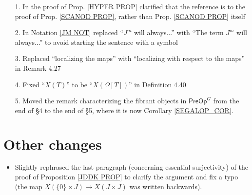 \documentclass{article}
\begin{document}

\begin{itemize}
	\item[1.] In the proof of Prop. \ref{HYPER PROP} clarified that the reference is to the proof of Prop. \ref{SCANOD PROP}, rather than Prop. \ref{SCANOD PROP} itself
	\item[2.] In Notation \ref{JM NOT}
	replaced ``$J^m$ will always...'' with
	``The term $J^m$ will always...''
	to avoid starting the sentence with a symbol
	\item[3.] Replaced ``localizing the maps'' with ``localizing with respect to the maps'' in Remark 4.27
	\item[4.] Fixed ``$X(T)$'' to be ``$X(\Omega[T])$''
	in Definition 4.40
	\item[5.] Moved the remark characterizing the fibrant objects in
	$\mathsf{PreOp}^G$ from the end of \S 4 to the end of \S 5,
	where it is now Corollary \ref{SEGALOP_COR}.
\end{itemize}


\section{Other changes}


\begin{itemize}
	\item Slightly rephrased the last paragraph 
	(concerning essential surjectivity)
	of the proof of Proposition \ref{JDDK PROP}
	to clarify the argument
	and fix a typo
	(the map
	$X(\{0\} \times J) \to X (J \times J)$
	was written backwards). 
\end{itemize}



{}


\end{document}
